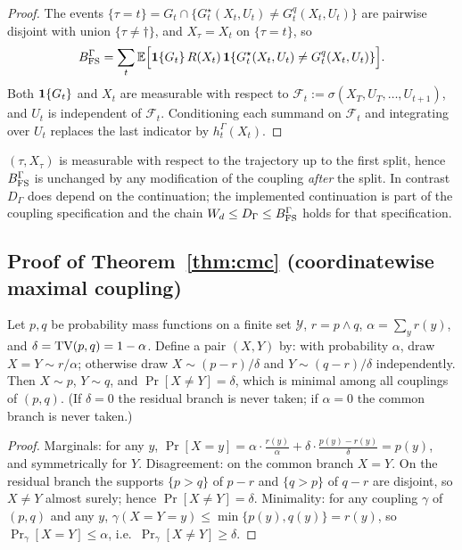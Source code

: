 \begin{proof}
The events $\{\tau=t\}=G_{t}\cap\{G^{\star}_{t}(X_{t},U_{t})\neq G^{q}_{t}(X_{t},U_{t})\}$ are
pairwise disjoint with union $\{\tau\neq\dagger\}$, and $X_{\tau}=X_{t}$ on $\{\tau=t\}$, so
\[
B_{\mathrm{FS}}^{\Gamma}
=\sum_{t}\mathbb{E}\Big[\mathbf{1}\{G_{t}\}\,R(X_{t})\,
\mathbf{1}\{G^{\star}_{t}(X_{t},U_{t})\neq G^{q}_{t}(X_{t},U_{t})\}\Big].
\]
Both $\mathbf{1}\{G_{t}\}$ and $X_{t}$ are measurable with respect to
$\mathcal{F}_{t}:=\sigma(X_{T},U_{T},\dots,U_{t+1})$, and $U_{t}$ is independent of
$\mathcal{F}_{t}$. Conditioning each summand on $\mathcal{F}_{t}$ and integrating over $U_{t}$
replaces the last indicator by $h^{\Gamma}_{t}(X_{t})$.
\end{proof}

\begin{remark}
\label{rem:G:presplit}
$(\tau,X_{\tau})$ is measurable with respect to the trajectory up to the first split, hence
$B_{\mathrm{FS}}^{\Gamma}$ is unchanged by any modification of the coupling \emph{after} the split. In
contrast $D_{\Gamma}$ does depend on the continuation; the implemented continuation is part of
the coupling specification and the chain
$W_{d}\le D_{\Gamma}\le B_{\mathrm{FS}}^{\Gamma}$ holds for that specification.
\end{remark}

\subsection{Proof of Theorem~\ref{thm:cmc} (coordinatewise maximal coupling)}
\label{app:proofs:cmc}

\begin{lemma}
\label{lem:G:maxcoupling}
Let $p,q$ be probability mass functions on a finite set $\mathcal{Y}$, $r=p\wedge q$,
$\alpha=\sum_{y}r(y)$, and $\delta=\mathrm{TV}(p,q)=1-\alpha$. Define a pair $(X,Y)$ by: with probability
$\alpha$, draw $X=Y\sim r/\alpha$; otherwise draw $X\sim(p-r)/\delta$ and $Y\sim(q-r)/\delta$
independently. Then $X\sim p$, $Y\sim q$, and $\Pr[X\neq Y]=\delta$, which is minimal among all
couplings of $(p,q)$. (If $\delta=0$ the residual branch is never taken; if $\alpha=0$ the common
branch is never taken.)
\end{lemma}

\begin{proof}
Marginals: for any $y$,
$\Pr[X=y]=\alpha\cdot\frac{r(y)}{\alpha}+\delta\cdot\frac{p(y)-r(y)}{\delta}=p(y)$, and
symmetrically for $Y$. Disagreement: on the common branch $X=Y$. On the residual branch the
supports $\{p>q\}$ of $p-r$ and $\{q>p\}$ of $q-r$ are disjoint, so $X\neq Y$ almost surely;
hence $\Pr[X\neq Y]=\delta$. Minimality: for any coupling $\gamma$ of $(p,q)$ and any $y$,
$\gamma(X=Y=y)\le\min\{p(y),q(y)\}=r(y)$, so $\Pr_{\gamma}[X=Y]\le\alpha$, i.e.\
$\Pr_{\gamma}[X\neq Y]\ge\delta$.
\end{proof}

